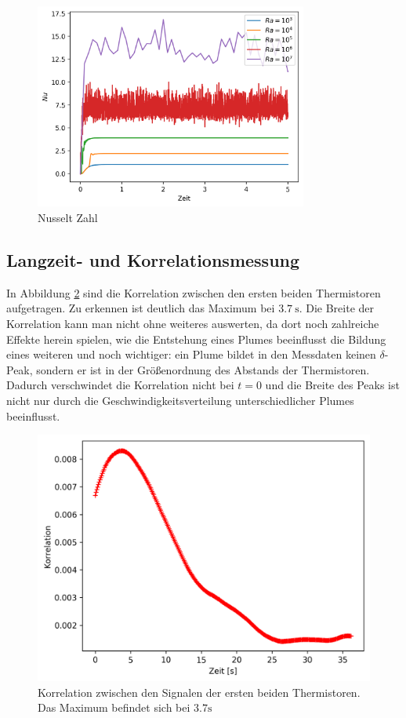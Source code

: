 \documentclass[12pt,a4paper,titlepage,headinclude]{scrartcl}
\numberwithin{equation}{subsection}
\begin{document}
\begin{figure}[!ht]
\centering
\includegraphics[width=0.8\textwidth]{Nu.png}
\caption{Nusselt Zahl}
\label{fig:nu_num}
\end{figure}





\subsection{Langzeit- und Korrelationsmessung}
In Abbildung \ref{fig:korrelation} sind die Korrelation zwischen den ersten beiden Thermistoren aufgetragen.
Zu erkennen ist deutlich das Maximum bei $\SI{3.7}\s$.
Die Breite der Korrelation kann man nicht ohne weiteres auswerten, da dort noch zahlreiche Effekte herein spielen, wie die Entstehung eines Plumes beeinflusst die Bildung eines weiteren und noch wichtiger: ein Plume bildet in den Messdaten keinen $\delta$-Peak, sondern er ist in der Gr\"o{\ss}enordnung des Abstands der Thermistoren.
Dadurch verschwindet die Korrelation nicht bei $t=0$ und die Breite des Peaks ist nicht nur durch die Geschwindigkeitsverteilung unterschiedlicher Plumes beeinflusst.

\begin{figure}[!ht]
	\centering
	\includegraphics[width=0.7\linewidth]{kor}
\caption{Korrelation zwischen den Signalen der ersten beiden Thermistoren. Das Maximum befindet sich bei $3.7\si\s$}
\label{fig:korrelation}
\end{figure}
\end{document}

